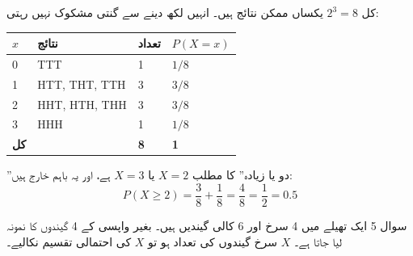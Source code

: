 \begin{hal}
کل \(2^{3}=8\) یکساں ممکن نتائج ہیں۔ انہیں لکھ دینے سے گنتی مشکوک نہیں رہتی:

\medskip
\begin{center}
\begin{tabular}{@{}p{2.0cm} p{5.4cm} p{1.8cm} p{2.0cm}@{}}
\toprule
\(x\) & نتائج & تعداد & \(P(X=x)\) \\
\midrule
\textenglish{0} & \textenglish{TTT}                & \textenglish{1} & \(1/8\) \\
\textenglish{1} & \textenglish{HTT, THT, TTH}      & \textenglish{3} & \(3/8\) \\
\textenglish{2} & \textenglish{HHT, HTH, THH}      & \textenglish{3} & \(3/8\) \\
\textenglish{3} & \textenglish{HHH}                & \textenglish{1} & \(1/8\) \\
\midrule
\textbf{کل} & & \textbf{\textenglish{8}} & \textbf{\textenglish{1}} \\
\bottomrule
\end{tabular}
\end{center}

\medskip
''دو یا زیادہ'' کا مطلب \(X=2\) یا \(X=3\) ہے، اور یہ باہم خارج ہیں:
\[
P(X\ge 2)=\frac{3}{8}+\frac{1}{8}=\frac{4}{8}=\frac12=0.5
\]

\end{hal}

\begin{sawal}{سوال \textenglish{5}}
ایک تھیلے میں \textenglish{4} سرخ اور \textenglish{6} کالی گیندیں ہیں۔ بغیر
واپسی کے \textenglish{4} گیندوں کا نمونہ لیا جاتا ہے۔ \(X\) سرخ گیندوں کی تعداد
ہو تو \(X\) کی احتمالی تقسیم نکالیے۔
\end{sawal}

